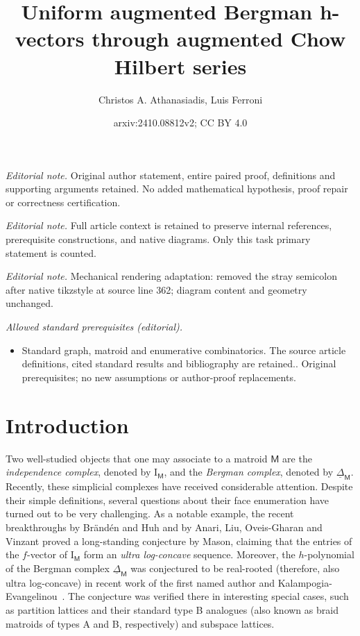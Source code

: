 \documentclass[11pt]{amsart}
\title{Uniform augmented Bergman h-vectors through augmented Chow Hilbert series}
\author{Christos A. Athanasiadis, Luis Ferroni}
\date{arxiv:2410.08812v2; CC BY 4.0}
\theoremstyle{theorems}
\theoremstyle{definition}
\newcommand{\M}{{\mathsf{M}}}
\newcommand{\I}{{\mathrm{I}}}
\newcommand{\uDelta}{\underline{\Delta}}
\begin{document}
\maketitle
\noindent\textit{Editorial note.} Original author statement, entire paired proof, definitions and supporting arguments retained. No added mathematical hypothesis, proof repair or correctness certification.\par\medskip
\noindent\textit{Editorial note.} Full article context is retained to preserve internal references, prerequisite constructions, and native diagrams. Only this task primary statement is counted.\par\medskip
\noindent\textit{Editorial note.} Mechanical rendering adaptation: removed the stray semicolon after native tikzstyle at source line 362; diagram content and geometry unchanged.\par\medskip
\noindent\textit{Allowed standard prerequisites (editorial).}\begin{itemize}
\item Standard graph, matroid and enumerative combinatorics. The source article definitions, cited standard results and bibliography are retained.. Original prerequisites; no new assumptions or author-proof replacements.
\end{itemize}\medskip
\section{Introduction}
\label{sec:intro}

Two well-studied objects that one may associate to a matroid $\M$ are the 
\emph{independence complex}, denoted by $\I_{\M}$, and the \emph{Bergman 
complex}, denoted by $\uDelta_{\M}$. Recently, these simplicial complexes 
have received considerable attention. Despite their simple definitions, 
several questions about their face enumeration have turned out to be very 
challenging. As a notable example, the recent breakthroughs by Br\"and\'en 
and Huh \cite{BH20} and by Anari, Liu, Oveis-Gharan and Vinzant 
\cite{ALOV24} proved a long-standing conjecture by Mason, claiming that 
the entries of the $f$-vector of $\I_{\M}$ form an \emph{ultra 
log-concave} sequence. Moreover, the $h$-polynomial of the Bergman complex 
$\uDelta_{\M}$ was conjectured to be real-rooted (therefore, also ultra 
log-concave) in recent work of the first named author and 
Kalampogia-Evangelinou~\cite{AK23}. The conjecture was verified there
in interesting special cases, such as partition lattices and their 
standard type B analogues (also known as braid matroids of types A and B,
respectively) and subspace lattices.
\end{document}
